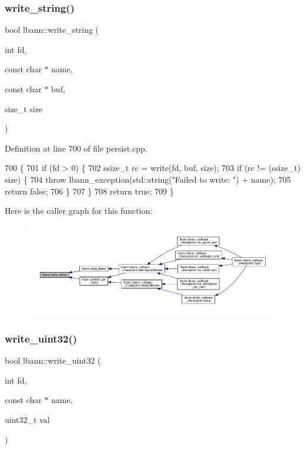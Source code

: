 \subsubsection{\texorpdfstring{write\+\_\+string()}{write\_string()}}
{\footnotesize\ttfamily bool lbann\+::write\+\_\+string (\begin{DoxyParamCaption}\item[{int}]{fd,  }\item[{const char $\ast$}]{name,  }\item[{const char $\ast$}]{buf,  }\item[{size\+\_\+t}]{size }\end{DoxyParamCaption})}



Definition at line 700 of file persist.\+cpp.


\begin{DoxyCode}
700                                                                                \{
701   \textcolor{keywordflow}{if} (fd > 0) \{
702     ssize\_t rc = write(fd, buf, size);
703     \textcolor{keywordflow}{if} (rc != (ssize\_t) size) \{
704       \textcolor{keywordflow}{throw} lbann\_exception(std::string(\textcolor{stringliteral}{"Failed to write: "}) + name);
705       \textcolor{keywordflow}{return} \textcolor{keyword}{false};
706     \}
707   \}
708   \textcolor{keywordflow}{return} \textcolor{keyword}{true};
709 \}
\end{DoxyCode}
Here is the caller graph for this function\+:\nopagebreak
\begin{figure}[H]
\begin{center}
\leavevmode
\includegraphics[width=350pt]{namespacelbann_add2807d7303bd96d2804f0b14e894c68_icgraph}
\end{center}
\end{figure}
\mbox{\label{namespacelbann_a3a801c9f48655f81b886af4bff083f27}} 
\subsubsection{\texorpdfstring{write\+\_\+uint32()}{write\_uint32()}}
{\footnotesize\ttfamily bool lbann\+::write\+\_\+uint32 (\begin{DoxyParamCaption}\item[{int}]{fd,  }\item[{const char $\ast$}]{name,  }\item[{uint32\+\_\+t}]{val }\end{DoxyParamCaption})}



